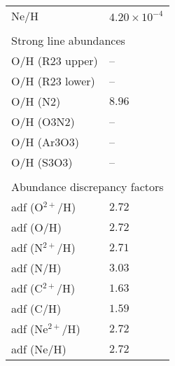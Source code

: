 \begin{longtable}[l]{ll}
 Ne/H                                & $  4.20\times 10^{ -4}$\\
 \vspace{0.2cm}\\\multicolumn{2}{l}{Strong line abundances}\\ \hline
 O/H (R23 upper)                     & -- \\
 O/H (R23 lower)                     & -- \\
 O/H (N2)                            & $  8.96$\\
 O/H (O3N2)                          & -- \\
 O/H (Ar3O3)                         & -- \\
 O/H (S3O3)                          & -- \\
 \vspace{0.2cm}\\\multicolumn{2}{l}{Abundance discrepancy factors}\\ \hline
 adf (O$^{2+}$/H)                    & $  2.72$\\
 adf (O/H)                           & $  2.72$\\
 adf (N$^{2+}$/H)                    & $  2.71$\\
 adf (N/H)                           & $  3.03$\\
 adf (C$^{2+}$/H)                    & $  1.63$\\
 adf (C/H)                           & $  1.59$\\
 adf (Ne$^{2+}$/H)                   & $  2.72$\\
 adf (Ne/H)                          & $  2.72$\\
 \end{longtable}
